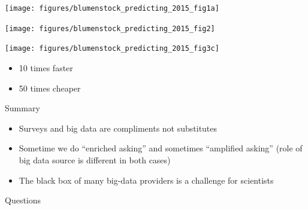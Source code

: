 \documentclass[aspectratio=169]{beamer}
\begin{document}
\begin{frame}

\begin{center}
\end{center}

\end{frame}
\begin{frame}

\begin{center}
\texttt{[image: figures/blumenstock\_predicting\_2015\_fig1a]}
\end{center}

\end{frame}
\begin{frame}

\begin{center}
\texttt{[image: figures/blumenstock\_predicting\_2015\_fig2]}
\end{center}

\end{frame}
\begin{frame}

\begin{center}
\texttt{[image: figures/blumenstock\_predicting\_2015\_fig3c]}
\end{center}

\pause

\begin{itemize}
\item 10 times faster
\item 50 times cheaper
\end{itemize}

\end{frame}
\begin{frame}{Summary}


\begin{itemize}
\item Surveys and big data are compliments not substitutes
\pause
\item Sometime we do ``enriched asking'' and sometimes ``amplified asking'' (role of big data source is different in both cases)
\pause
\item The black box of many big-data providers is a challenge for scientists
\end{itemize}

\end{frame}
\begin{frame}

\begin{center}
    Questions
\end{center}

\end{frame}
\end{document}
